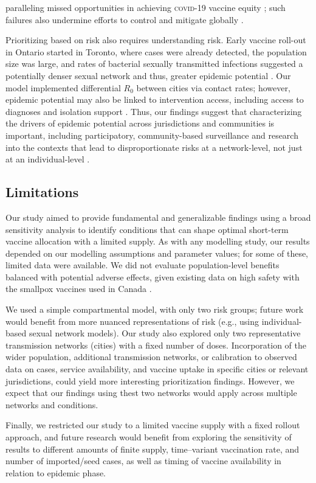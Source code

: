paralleling missed opportunities in achieving \textsc{covid-19} vaccine equity \cite{Yamey2022};
such failures also undermine efforts to control and mitigate \MPXV globally \cite{Zarocostas2022}.
\par
Prioritizing based on risk also requires understanding risk.
Early vaccine roll-out in Ontario started in Toronto,
where cases were already detected, the population size was large, and
rates of bacterial sexually transmitted infections suggested
a potentially denser sexual network and thus, greater epidemic potential \cite{Endo2022}.
Our model implemented differential $R_0$ between cities via contact rates;
however, epidemic potential may also be linked to intervention access,
including access to diagnoses and isolation support \cite{Millett2012,Cevik2021supp}.
Thus, our findings suggest that characterizing the drivers of epidemic potential
across jurisdictions and communities is important,
including participatory, community-based surveillance and research
into the contexts that lead to disproportionate risks at a network-level,
not just at an individual-level \cite{Baral2013,Cevik2021net}.
\subsection{Limitations}
Our study aimed to provide fundamental and generalizable findings
using a broad sensitivity analysis to identify conditions that can shape
optimal short-term vaccine allocation with a limited supply.
As with any modelling study, our results depended on
our modelling assumptions and parameter values;
for some of these, limited data were available.
We did not evaluate population-level benefits balanced with potential adverse effects,
given existing data on high safety with the smallpox vaccines used in Canada \cite{Frey2013,WHO2015}.
\par
We used a simple compartmental model, with only two risk groups;
future work would benefit from more nuanced representations of risk
(e.g., using individual-based sexual network models).
Our study also explored only two representative \GBMSM transmission networks (cities)
with a fixed number of doses.
Incorporation of the wider population, additional transmission networks, or
calibration to observed data on cases, service availability, and vaccine uptake
in specific cities or relevant jurisdictions,
could yield more interesting prioritization findings.
However, we expect that our findings using thest two networks
would apply across multiple networks and conditions.
\par
Finally, we restricted our study to a limited vaccine supply with a fixed rollout approach,
and future research would benefit from exploring the sensitivity of results to
different amounts of finite supply,
time–variant vaccination rate, and
number of imported/seed cases,
as well as timing of vaccine availability in relation to epidemic phase.
